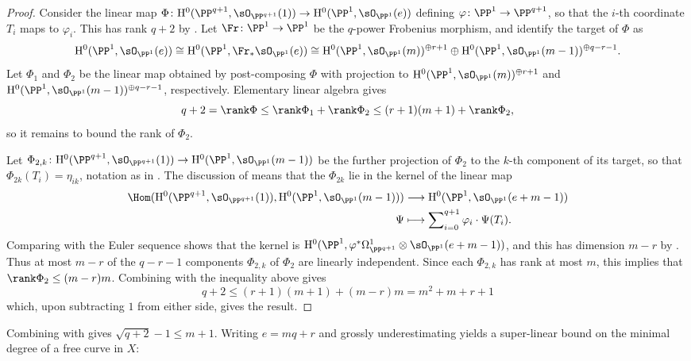 \begin{proof}
Consider the linear map
\(
\Phi \colon
\mathrm{H}^0(\PP^{q+1}, \sO_{\PP^{q+1}}(1)) \to
\mathrm{H}^0(\PP^1,\sO_{\PP^1}(e))
\) defining \(\varphi \colon \PP^1 \to \PP^{q+1}\), so that
the \(i\)-th coordinate \(T_i\) maps to \(\varphi_i\). This has rank \(q+2\) by
. Let \(\Fr \colon \PP^1 \to \PP^1\) be
the \(q\)-power Frobenius morphism, and identify the target of \(\Phi\) as
\[
\mathrm{H}^0(\PP^1, \sO_{\PP^1}(e)) \cong
\mathrm{H}^0(\PP^1, \Fr_*\sO_{\PP^1}(e)) \cong
\mathrm{H}^0(\PP^1, \sO_{\PP^1}(m))^{\oplus r+1} \oplus
\mathrm{H}^0(\PP^1, \sO_{\PP^1}(m-1))^{\oplus q-r-1}.
\]
Let \(\Phi_1\) and \(\Phi_2\) be the linear map obtained by post-composing
\(\Phi\) with projection to \(\mathrm{H}^0(\PP^1, \sO_{\PP^1}(m))^{\oplus r+1}\)
and \(\mathrm{H}^0(\PP^1, \sO_{\PP^1}(m-1))^{\oplus q-r-1}\), respectively.
Elementary linear algebra gives
\[
q+2 = \rank\Phi \leq \rank \Phi_1 + \rank \Phi_2 \leq (r+1)(m+1) + \rank\Phi_2,
\]
so it remains to bound the rank of \(\Phi_2\).

Let \(\Phi_{2,k} \colon \mathrm{H}^0(\PP^{q+1},\sO_{\PP^{q+1}}(1)) \to \mathrm{H}^0(\PP^1,\sO_{\PP^1}(m-1))\)
be the further projection of \(\Phi_2\) to the \(k\)-th component of its
target, so that \(\Phi_{2k}(T_i) = \eta_{ik}\), notation as in
. The discussion of
 means that the \(\Phi_{2k}\) lie in the kernel
of the linear map
\begin{align*}
\Hom(\mathrm{H}^0(\PP^{q+1},\sO_{\PP^{q+1}}(1)), \mathrm{H}^0(\PP^1, \sO_{\PP^1}(m-1)))
& \longrightarrow
\mathrm{H}^0(\PP^1, \sO_{\PP^1}(e + m - 1)) \\
\Psi & \longmapsto \sum\nolimits_{i = 0}^{q+1} \varphi_i \cdot \Psi(T_i).
\end{align*}
Comparing with the Euler sequence shows that the kernel is
\(\mathrm{H}^0(\PP^1, \varphi^*\Omega^1_{\PP^{q+1}} \otimes \sO_{\PP^1}(e+m-1))\),
and this has dimension \(m-r\) by . Thus at most \(m - r\)
of the \(q-r-1\) components \(\Phi_{2,k}\) of \(\Phi_2\) are linearly independent.
Since each \(\Phi_{2,k}\) has rank at most \(m\), this implies that
\(\rank\Phi_2 \leq (m-r)m\). Combining with the inequality above gives
\[
q+2 \leq (r+1)(m+1) + (m-r)m = m^2 + m + r + 1
\]
which, upon subtracting \(1\) from either side, gives the result.
\end{proof}

Combining  with  gives
\(\sqrt{q+2} - 1 \leq m+1\). Writing \(e = mq + r\) and grossly underestimating
yields a super-linear bound on the minimal degree of a free curve in \(X\):

